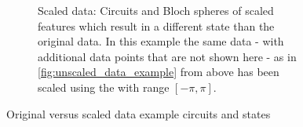 \begin{figure}[h!]
\begin{subfigure}{1.0\textwidth}
        \caption{Scaled data: Circuits and Bloch spheres of scaled features which result in a different state than the original data. In this example the same data - with additional data points that are not shown here - as in \ref{fig:unscaled_data_example} from above has been scaled using the  with range $[-\pi,\pi]$.}
        \label{fig:scaled_data_example}
    \end{subfigure}
    \caption{Original versus scaled data example circuits and states}
    \label{fig:scaled_unscaled_data_example}
\end{figure}
